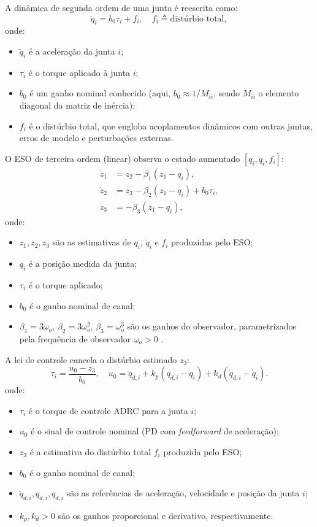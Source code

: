 A dinâmica de segunda ordem de uma junta é reescrita como:
\begin{equation}
    \ddot{q}_i = b_0 \tau_i + f_i, \quad f_i \triangleq \text{distúrbio total},
    \label{eq:adrc_plant}
\end{equation}
onde:
\begin{itemize}
    \item $\ddot{q}_i$ é a aceleração da junta $i$;
    \item $\tau_i$ é o torque aplicado à junta $i$;
    \item $b_0$ é um ganho nominal conhecido (aqui, $b_0 \approx 1/M_{ii}$, sendo $M_{ii}$ o elemento diagonal da matriz de inércia);
    \item $f_i$ é o distúrbio total, que engloba acoplamentos dinâmicos com outras juntas, erros de modelo e perturbações externas.
\end{itemize}

O ESO de terceira ordem (linear) observa o estado aumentado $[q_i, \dot{q}_i, f_i]$:
\begin{align}
    \dot{z}_1 &= z_2 - \beta_1(z_1 - q_i), \label{eq:eso1}\\
    \dot{z}_2 &= z_3 - \beta_2(z_1 - q_i) + b_0\tau_i, \label{eq:eso2}\\
    \dot{z}_3 &= -\beta_3(z_1 - q_i), \label{eq:eso3}
\end{align}
onde:
\begin{itemize}
    \item $z_1, z_2, z_3$ são as estimativas de $q_i$, $\dot{q}_i$ e $f_i$ produzidas pelo ESO;
    \item $q_i$ é a posição medida da junta;
    \item $\tau_i$ é o torque aplicado;
    \item $b_0$ é o ganho nominal de canal;
    \item $\beta_1 = 3\omega_o$, $\beta_2 = 3\omega_o^2$, $\beta_3 = \omega_o^3$ são os ganhos do observador, parametrizados pela frequência de observador $\omega_o > 0$ \cite{gao2003scaling}.
\end{itemize}

A lei de controle cancela o distúrbio estimado $z_3$:
\begin{equation}
    \tau_i = \frac{u_0 - z_3}{b_0}, \quad u_0 = \ddot{q}_{d,i} + k_p(q_{d,i} - q_i) + k_d(\dot{q}_{d,i} - \dot{q}_i).
    \label{eq:adrc_control}
\end{equation}
onde:
\begin{itemize}
    \item $\tau_i$ é o torque de controle ADRC para a junta $i$;
    \item $u_0$ é o sinal de controle nominal (PD com \textit{feedforward} de aceleração);
    \item $z_3$ é a estimativa do distúrbio total $f_i$ produzida pelo ESO;
    \item $b_0$ é o ganho nominal de canal;
    \item $\ddot{q}_{d,i}, \dot{q}_{d,i}, q_{d,i}$ são as referências de aceleração, velocidade e posição da junta $i$;
    \item $k_p, k_d > 0$ são os ganhos proporcional e derivativo, respectivamente.
\end{itemize}

